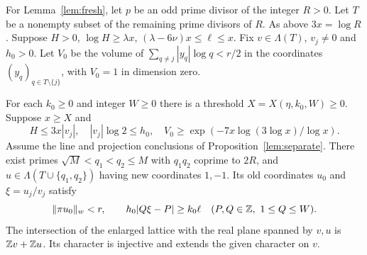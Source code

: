 For Lemma~\ref{lem:fresh}, let $p$ be an odd prime divisor of the integer $R>0$.
Let $T$ be a nonempty subset of the remaining prime divisors of $R$.
As above $3x=\log R$. Suppose $H>0$, $\log H\ge\lambda x$,
$(\lambda-6\nu)x\le\ell\le x$. Fix $v\in\Lambda(T)$, $v_j\ne0$ and $h_0>0$.
Let $V_0$ be the volume of $\sum_{q\ne j}|y_q|\log q<r/2$ in the
coordinates $(y_q)_{q\in T\setminus\{j\}}$, with $V_0=1$ in dimension zero.

\begin{lemma}\label{lem:fresh}
For each $k_0\ge0$ and integer $W\ge0$ there is a threshold
$X=X(\eta,k_0,W)\ge0$. Suppose $x\ge X$ and
\[
 H\le3x|v_j|,\quad |v_j|\log2\le h_0,\quad
 V_0\ge\exp(-7x\log(3\log x)/\log x).
\]
Assume the line and projection conclusions of Proposition~\ref{lem:separate}.
There exist primes $\sqrt M<q_1<q_2\le M$ with $q_1q_2$ coprime to
$2R$, and $u\in\Lambda(T\cup\{q_1,q_2\})$ having new coordinates $1,-1$.
Its old coordinates $u_0$ and $\xi=u_j/v_j$ satisfy
\[
 \|\pi u_0\|_w<r,\qquad
 h_0|Q\xi-P|\ge k_0\ell\quad(P,Q\in\mathbb Z,\ 1\le Q\le W).
\]
The intersection of the enlarged lattice with the real plane spanned
by $v,u$ is $\mathbb Z v+\mathbb Z u$. Its character is injective and extends the
given character on $v$.
\end{lemma}

